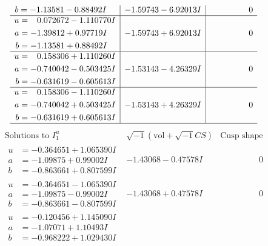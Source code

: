 \documentclass[1p]{elsarticle_modified}
\theoremstyle{definition}
\newcommand{\I}{\sqrt{-1}}
\begin{document}
$$\begin{array}{c|c|c}
\begin{aligned}
b &= -1.13581 - 0.88492 I\end{aligned}
 & -1.59743 - 6.92013 I & \phantom{-0.000000 } 0 \\ \hline\begin{aligned}
u &= \phantom{-}0.072672 - 1.110770 I \\
a &= -1.39812 + 0.97719 I \\
b &= -1.13581 + 0.88492 I\end{aligned}
 & -1.59743 + 6.92013 I & \phantom{-0.000000 } 0 \\ \hline\begin{aligned}
u &= \phantom{-}0.158306 + 1.110260 I \\
a &= -0.740042 - 0.503425 I \\
b &= -0.631619 - 0.605613 I\end{aligned}
 & -1.53143 - 4.26329 I & \phantom{-0.000000 } 0 \\ \hline\begin{aligned}
u &= \phantom{-}0.158306 - 1.110260 I \\
a &= -0.740042 + 0.503425 I \\
b &= -0.631619 + 0.605613 I\end{aligned}
 & -1.53143 + 4.26329 I & \phantom{-0.000000 } 0\\
 \hline 
 \end{array}$$\newpage$$\begin{array}{c|c|c}  
\text{Solutions to }I^u_{1}& \I (\text{vol} + \sqrt{-1}CS) & \text{Cusp shape}\\
 \hline 
\begin{aligned}
u &= -0.364651 + 1.065390 I \\
a &= -1.09875 + 0.99002 I \\
b &= -0.863661 + 0.807599 I\end{aligned}
 & -1.43068 - 0.47578 I & \phantom{-0.000000 } 0 \\ \hline\begin{aligned}
u &= -0.364651 - 1.065390 I \\
a &= -1.09875 - 0.99002 I \\
b &= -0.863661 - 0.807599 I\end{aligned}
 & -1.43068 + 0.47578 I & \phantom{-0.000000 } 0 \\ \hline\begin{aligned}
u &= -0.120456 + 1.145090 I \\
a &= -1.07071 + 1.10493 I \\
b &= -0.968222 + 1.029430 I\end{aligned}

\end{array}$$
\end{document}
